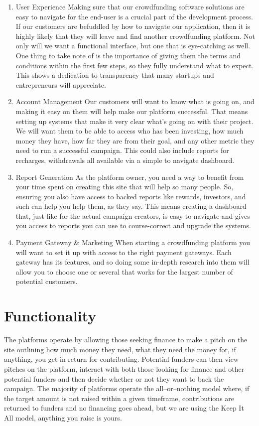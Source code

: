 \begin{enumerate}
      \item
            User Experience
            Making sure that our crowdfunding software solutions are easy to navigate for the end-user is a crucial part of the development process. If our customers are befuddled by how to navigate our application, then it is highly likely that they will leave and find another crowdfunding platform. Not only will we want a functional interface, but one that is eye-catching as well.
            One thing to take note of is the importance of giving them the terms and conditions within the first few steps, so they fully understand what to expect. This shows a dedication to transparency that many startups and entrepreneurs will appreciate.

      \item
            Account Management
            Our customers will want to know what is going on, and making it easy on them will help make our platform successful. That means setting up systems that make it very clear what’s going on with their project. We will want them to be able to access who has been investing, how much money they have, how far they are from their goal, and any other metric they need to run a successful campaign. This could also include reports for recharges, withdrawals all available via a simple to navigate dashboard.
      \item

            Report Generation
            As the platform owner, you need a way to benefit from your time spent on creating this site that will help so many people. So, ensuring you also have access to backed reports like rewards, investors, and such can help you help them, as they say. This means creating a dashboard that, just like for the actual campaign creators, is easy to navigate and gives you access to reports you can use to course-correct and upgrade the systems.
      \item
            Payment Gateway \& Marketing
            When starting a crowdfunding platform you will want to set it up with access to the right payment gateways. Each gateway has its features, and so doing some in-depth research into them will allow you to choose one or several that works for the largest number of potential customers.
\end{enumerate}



\section{Functionality}
The platforms operate by allowing those seeking finance to make a pitch on the site outlining how much money they need, what they need the money for, if anything, you get in return for contributing. Potential funders can then view pitches on the platform, interact with both those looking for finance and other potential funders and then decide whether or not they want to back the campaign. The majority of platforms operate the all–or–nothing model where, if the target amount is not raised within a given timeframe, contributions are returned to funders and no financing goes ahead, but we are using the Keep It All model, anything you raise is yours.

